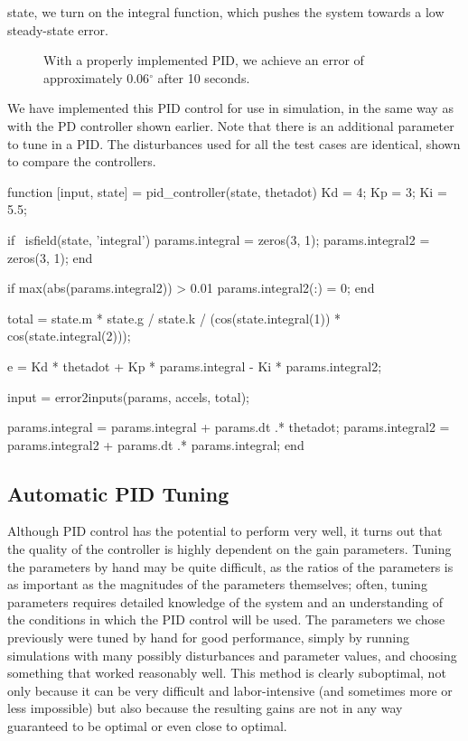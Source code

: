 \documentclass{article}
\begin{document}
state, we turn on the integral function, which pushes the system towards a low steady-state error.
\begin{figure}[H]
    \caption{
        With a properly implemented PID, we achieve an error of approximately 0.06$^\circ$ after 10 seconds.
    }
    \label{pid}
\end{figure}
We have implemented this PID control for use in simulation, in the same way as with the PD
controller shown earlier. Note that there is an additional parameter to tune in a PID. The
disturbances used for all the test cases are identical, shown to compare the controllers.
\begin{matlabcode}
function [input, state] = pid_controller(state, thetadot)
    Kd = 4;
    Kp = 3;
    Ki = 5.5;

    if ~isfield(state, 'integral')
        params.integral = zeros(3, 1);
        params.integral2 = zeros(3, 1);
    end

    if max(abs(params.integral2)) > 0.01
        params.integral2(:) = 0;
    end

    total = state.m * state.g / state.k / (cos(state.integral(1)) * cos(state.integral(2)));

    e = Kd * thetadot + Kp * params.integral - Ki * params.integral2;

    input = error2inputs(params, accels, total);

    params.integral = params.integral + params.dt .* thetadot;
    params.integral2 = params.integral2 + params.dt .* params.integral;
end
\end{matlabcode}
\pagebreak

\subsection*{Automatic PID Tuning}
Although PID control has the potential to perform very well, it turns out that the quality of the
controller is highly dependent on the gain parameters. Tuning the parameters by hand may be quite
difficult, as the ratios of the parameters is as important as the magnitudes of the parameters
themselves; often, tuning parameters requires detailed knowledge of the system and an understanding
of the conditions in which the PID control will be used. The parameters we chose previously were
tuned by hand for good performance, simply by running simulations with many possibly disturbances
and parameter values, and choosing something that worked reasonably well. This method is clearly
suboptimal, not only because it can be very difficult and labor-intensive (and sometimes more or
less impossible) but also because the resulting gains are not in any way guaranteed to be optimal or
even close to optimal.
\end{document}
